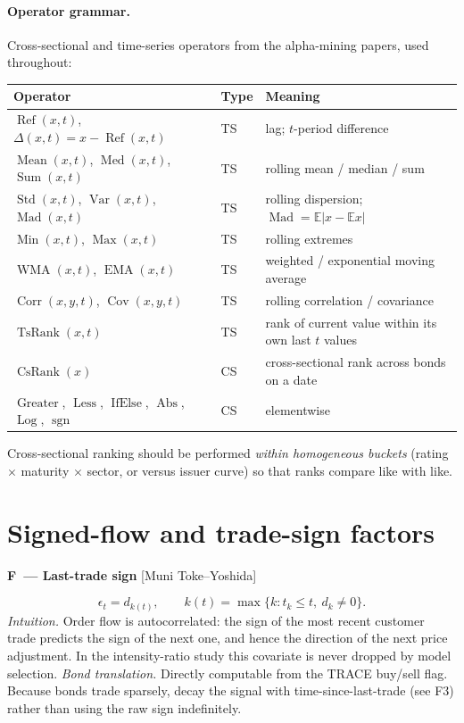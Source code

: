 \documentclass[11pt]{article}
\newcommand{\E}{\mathbb{E}}
\newcommand{\sgn}{\operatorname{sgn}}
\newcommand{\Rank}{\operatorname{CsRank}}
\newcommand{\TsRank}{\operatorname{TsRank}}
\DeclareMathOperator{\EMA}{EMA}
\DeclareMathOperator{\Std}{Std}
\DeclareMathOperator{\Corr}{Corr}
\DeclareMathOperator{\Cov}{Cov}
\DeclareMathOperator{\Mean}{Mean}
\newcounter{fac}
\newcommand{\factor}[2]{%
  \refstepcounter{fac}%
  \par\medskip\noindent\textbf{F\thefac\ --- #1} \hfill {\small[#2]}\par\nopagebreak}
\begin{document}
\paragraph{Operator grammar.} Cross-sectional and time-series operators from the alpha-mining papers, used throughout:
\begin{center}
\small
\begin{tabular}{@{}lll@{}}
\toprule
Operator & Type & Meaning \\
\midrule
$\operatorname{Ref}(x,t)$, $\Delta(x,t) = x - \operatorname{Ref}(x,t)$ & TS & lag; $t$-period difference \\
$\Mean(x,t)$, $\operatorname{Med}(x,t)$, $\operatorname{Sum}(x,t)$ & TS & rolling mean / median / sum \\
$\Std(x,t)$, $\operatorname{Var}(x,t)$, $\operatorname{Mad}(x,t)$ & TS & rolling dispersion; $\operatorname{Mad}=\E|x-\E x|$ \\
$\operatorname{Min}(x,t)$, $\operatorname{Max}(x,t)$ & TS & rolling extremes \\
$\operatorname{WMA}(x,t)$, $\EMA(x,t)$ & TS & weighted / exponential moving average \\
$\Corr(x,y,t)$, $\Cov(x,y,t)$ & TS & rolling correlation / covariance \\
$\TsRank(x,t)$ & TS & rank of current value within its own last $t$ values \\
$\Rank(x)$ & CS & cross-sectional rank across bonds on a date \\
$\operatorname{Greater}$, $\operatorname{Less}$, $\operatorname{IfElse}$, $\operatorname{Abs}$, $\operatorname{Log}$, $\sgn$ & CS & elementwise \\
\bottomrule
\end{tabular}
\end{center}
Cross-sectional ranking should be performed \emph{within homogeneous buckets} (rating $\times$ maturity $\times$ sector, or versus issuer curve) so that ranks compare like with like.

\section{Signed-flow and trade-sign factors}\label{sec:flow}

\factor{Last-trade sign}{Muni Toke--Yoshida}
\[
\epsilon_t = d_{k(t)}, \qquad k(t) = \max\{k : t_k \le t,\ d_k \neq 0\}.
\]
\emph{Intuition.} Order flow is autocorrelated: the sign of the most recent customer trade predicts the sign of the next one, and hence the direction of the next price adjustment. In the intensity-ratio study this covariate is never dropped by model selection.
\emph{Bond translation.} Directly computable from the TRACE buy/sell flag. Because bonds trade sparsely, decay the signal with time-since-last-trade (see F3) rather than using the raw sign indefinitely.
\end{document}
